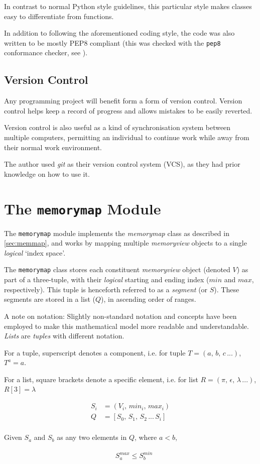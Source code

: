 \documentclass[10pt,a4paper,notitlepage]{report}
\begin{document}
In contrast to normal Python style guidelines, this particular style makes classes easy to differentiate from functions.

In addition to following the aforementioned coding style, the code was also written to be mostly PEP8\cite{pep8} compliant (this was checked with the \texttt{pep8} conformance checker, see \cite{pep8chk}).

\subsection{Version Control}
Any programming project will benefit form a form of version control. Version control helps keep a record of progress and allows mistakes to be easily reverted.

Version control is also useful as a kind of synchronisation system between multiple computers, permitting an individual to continue work while away from their normal work environment.

The author used \emph{git} as their version control system (VCS), as they had prior knowledge on how to use it.

\section{The \texttt{memorymap} Module}
The \texttt{memorymap} module implements the \emph{memorymap} class as described in \ref{sec:memmap}, and works by mapping multiple \emph{memoryview} objects to a single \emph{logical} `index space'.

The \texttt{memorymap} class stores each constituent \emph{memoryview} object (denoted $V$) as part of a three-tuple,  with their \emph{logical} starting and ending index ($min$ and $max$, respectively). This tuple is henceforth referred to as a \emph{segment} (or $S$). These segments are stored in a list ($Q$), in ascending order of ranges.

{\small
A note on notation: Slightly non-standard notation and concepts have been employed to make this mathematical model more readable and understandable. \emph{Lists} are \emph{tuples} with different notation.

For a tuple, superscript denotes a component, i.e.  for tuple $T = (a,\, b,\, c\, ...)$,   $T^{a} = a$.

For a list, square brackets denote a specific element, i.e. for list $R = (\pi,\, \epsilon,\, \lambda\, ...)$, $R[3] = \lambda$
}

\begin{align*}
S_{i} &= ( V_{i},\, min_{i},\, max_{i} )\\
Q &= [ S_{0},\, S_{1},\, S_{2}\, ... \,S_{i} ]\\
\end{align*}
\begin{center}
Given $S_{a}$ and $S_{b}$ as any two elements in $Q$, where $a < b$,
\end{center}
\begin{align*}
&\ S_{a}^{max} \leq S_{b}^{min} 
\end{align*}
\end{document}
